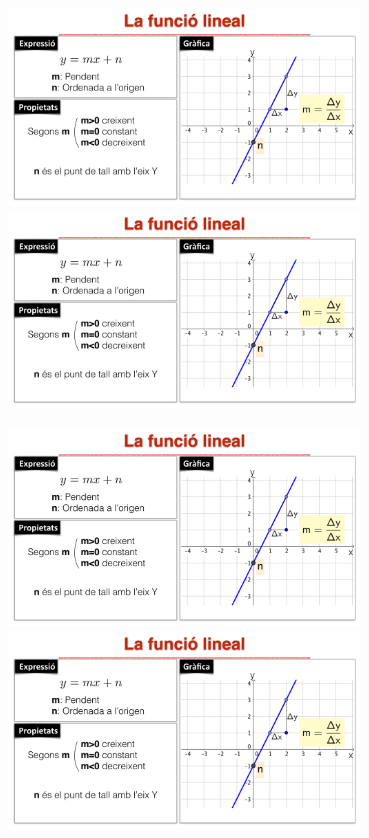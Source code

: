 \newpage
\resum 
\begin{center}
\includegraphics[width=0.7\textwidth,angle=90,origin=c,page=3]{img-05/funcions-elementals}
\hspace{1cm}
\includegraphics[width=0.7\textwidth,angle=90,origin=c,page=4]{img-05/funcions-elementals}

\includegraphics[width=0.7\textwidth,angle=90,origin=c,page=1]{img-05/funcions-elementals}
\hspace{1cm}
\includegraphics[width=0.7\textwidth,angle=90,origin=c,page=2]{img-05/funcions-elementals}
\end{center}

